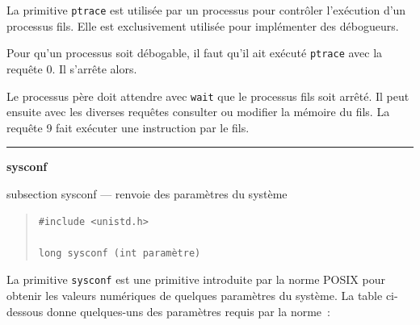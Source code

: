 \documentclass [twoside] {report}
\newcommand {\primitive} [1]
    {
	\phantomsection
	{\large \textbf {#1}}
	\addcontentsline {toc} {subsection} {#1}
    }
\newcommand {\separation}
    {
	\vspace {5mm}
	\nopagebreak
	\hrule
    }
\begin{document}
La primitive \texttt {ptrace} est utilisée par un
processus pour contrôler l'exécution d'un
processus fils. Elle est exclusivement utilisée
pour implémenter des débogueurs.

Pour qu'un processus soit débogable, il faut
qu'il ait exécuté \texttt {ptrace} avec la requête 0. Il
s'arrête alors.

Le processus père doit attendre avec \texttt {wait} que
le processus fils soit arrêté. Il peut ensuite
avec les diverses requêtes consulter ou modifier
la mémoire du fils. La requête 9 fait exécuter une
instruction par le fils.




\separation
\primitive {sysconf} --- renvoie des paramètres du système
    \label {sysconf}

\begin {quote}
\begin {verbatim}
#include <unistd.h>

long sysconf (int paramètre)
\end{verbatim}
\end {quote}

La primitive \texttt {sysconf} est une primitive introduite
par la norme POSIX pour obtenir les valeurs numériques
de quelques paramètres du système. La table ci-dessous
donne quelques-uns des paramètres requis par la norme~:
\end{document}
